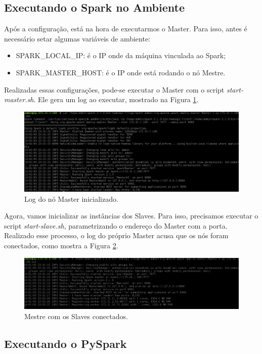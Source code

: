 \documentclass{article}
\begin{document}
\subsection{Executando o Spark no Ambiente}

Após a configuração, está na hora de executarmos o Master. Para isso, antes é necessário setar algumas variáveis de ambiente:


\begin{itemize}
\item SPARK\_LOCAL\_IP: é o IP onde da máquina vinculada ao Spark;
\item SPARK\_MASTER\_HOST: é o IP onde está rodando o nó Mestre.
\end{itemize}

Realizadas essas configurações, pode-se executar o Master com o script \emph{start-master.sh}. Ele gera um log ao executar, mostrado na Figura \ref{fig:spark_log}.

\begin{figure}[h]
  \includegraphics[width=\linewidth]{img/spark_log.png}
  \caption{Log do nó Master inicializado.}
  \label{fig:spark_log}
\end{figure}

Agora, vamos inicializar as instâncias dos Slaves. Para isso, precisamos executar o script \emph{start-slave.sh}, parametrizando o endereço do Master com a porta.
Realizado esse processo, o log do próprio Master acusa que os nós foram conectados, como mostra a Figura \ref{fig:env_ready}.

\begin{figure}[h]
  \includegraphics[width=\linewidth]{img/environment_ready.png}
  \caption{Mestre com os Slaves conectados.}
  \label{fig:env_ready}
\end{figure}

\subsection{Executando o PySpark}
\end{document}
